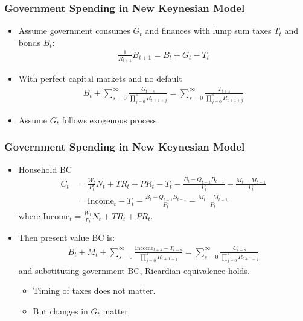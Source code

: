 \documentclass[english,xcolor=svgnames]{beamer}
\begin{document}
\begin{frame}
\frametitle{Government Spending in New Keynesian Model}

\begin{itemize}
\item Assume government consumes $G_t$ and finances with lump sum taxes $T_t$ and bonds $B_t$:
\begin{align*}
	\frac{1}{R_{t+1}}B_{t+1}=B_t+G_t-T_t
\end{align*}
\item With perfect capital markets and no default
\begin{align*}
	B_t + \sum_{s=0}^{\infty}\frac{G_{t+s}}{\prod_{j=0}^s R_{t+1+j}} = \sum_{s=0}^{\infty}\frac{T_{t+s}}{\prod_{j=0}^s R_{t+1+j}}
\end{align*}
\item  Assume $G_t$ follows exogenous process.
\end{itemize}	
\end{frame}

\begin{frame}
\frametitle{Government Spending in New Keynesian Model}

\begin{itemize}
\item Household BC
\begin{align*}
	C_t &= \frac{W_t}{P_t}N_t+TR_t+PR_t-T_t-\frac{B_t-Q_{t-1}B_{t-1}}{P_t}-\frac{M_t-M_{t-1}}{P_t} \\
	&=\text{Income}_t - T_t - \frac{B_t-Q_{t-1}B_{t-1}}{P_t}-\frac{M_t-M_{t-1}}{P_t}
\end{align*}
where $\text{Income}_t=\frac{W_t}{P_t}N_t+TR_t+PR_t$.
\item Then present value BC is:
\begin{align*}
	B_t + M_t +\sum_{s=0}^{\infty}\frac{\text{Income}_{t+s}-T_{t+s}}{\prod_{j=0}^s R_{t+1+j}} = \sum_{s=0}^{\infty}\frac{C_{t+s}}{\prod_{j=0}^s R_{t+1+j}}
\end{align*}
and substituting government BC, Ricardian equivalence holds.
\begin{itemize}
	\item Timing of taxes does not matter.
	\item But changes in $G_t$ matter.
\end{itemize}
\end{itemize}	
\end{frame}
\end{document}
